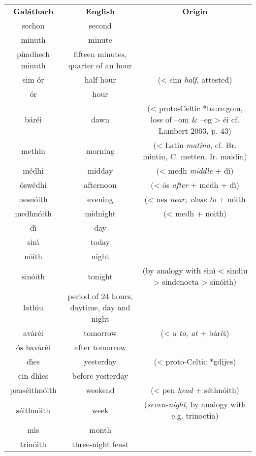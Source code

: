 \begin{table}[H]
\centering
\begin{tabular}{ccc}
  \toprule
  \textbf{Gal\'{a}thach} & \textbf{English} & \textbf{Origin}\\
  \cmidrule(lr){1-1}\cmidrule(lr){2-2}\cmidrule(lr){3-3}
  sechon & second & \\
  minuth & minute & \\
  pimdhech minuth & fifteen minutes, quarter of an hour\\
  sim \'{o}r & half hour & (< sim \textit{half}, attested)\\
  \'{o}r & hour & \\
  \midrule
  b\'{a}r\'{e}i & dawn & (< proto-Celtic *ba:re:gom, loss of –om \& –eg > \'{e}i cf. Lambert 2003, p. 43)\\
  methin & morning & (< Latin \textit{matina}, cf. Br. mintin, C. metten, Ir. maidin)\\
  m\'{e}dhi & midday & (< medh \textit{middle} + d\'{\i})\\
  \'{o}sw\'{e}dhi & afternoon & (< \'{o}s \textit{after} + medh + d\'{\i})\\
  nesn\'{o}ith & evening & (< nes \textit{near, close to} + n\'{o}ith\\
  medhn\'{o}ith & midnight & (< medh + noith)\\
  \midrule
  d\'{\i} & day & \\
  sin\'{\i} & today & \\
  n\'{o}ith & night & \\
  sin\'{o}ith & tonight & (by analogy with sin\'{\i} < sindiu > sindenocta > sin\'{o}ith)\\
  lath\'{\i}u & period of 24 hours, daytime, day and night & \\
  \midrule
  av\'{a}r\'{e}i & tomorrow & (< a \textit{to, at} + b\'{a}r\'{e}i)\\
  \'{o}s hav\'{a}r\'{e}i & after tomorrow & \\
  d\'{\i}es & yesterday & (< proto-Celtic *gdijes)\\
  cin dh\'{\i}es & before yesterday & \\
  \midrule
  pens\'{e}ithn\'{o}ith & weekend & (< pen \textit{head} + s\'{e}thn\'{o}ith)\\
  s\'{e}ithn\'{o}ith & week & (\textit{seven-night}, by analogy with e.g. trinoctia)\\
  m\'{\i}s & month & \\
  \midrule
  trin\'{o}ith & three-night feast & \\

\end{tabular}
\end{table}
